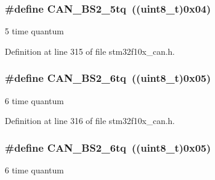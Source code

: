 \subsubsection[{\texorpdfstring{C\+A\+N\+\_\+\+B\+S2\+\_\+5tq}{CAN_BS2_5tq}}]{\setlength{\rightskip}{0pt plus 5cm}\#define C\+A\+N\+\_\+\+B\+S2\+\_\+5tq~(({\bf uint8\+\_\+t})0x04)}\hypertarget{group___c_a_n__time__quantum__in__bit__segment__2_ga89feba32bcc2e909f858d535edaad101}{}\label{group___c_a_n__time__quantum__in__bit__segment__2_ga89feba32bcc2e909f858d535edaad101}
5 time quantum 

Definition at line 315 of file stm32f10x\+\_\+can.\+h.

\subsubsection[{\texorpdfstring{C\+A\+N\+\_\+\+B\+S2\+\_\+6tq}{CAN_BS2_6tq}}]{\setlength{\rightskip}{0pt plus 5cm}\#define C\+A\+N\+\_\+\+B\+S2\+\_\+6tq~(({\bf uint8\+\_\+t})0x05)}\hypertarget{group___c_a_n__time__quantum__in__bit__segment__2_ga72c3245b794d3238763d1ec319bf386f}{}\label{group___c_a_n__time__quantum__in__bit__segment__2_ga72c3245b794d3238763d1ec319bf386f}
6 time quantum 

Definition at line 316 of file stm32f10x\+\_\+can.\+h.

\subsubsection[{\texorpdfstring{C\+A\+N\+\_\+\+B\+S2\+\_\+6tq}{CAN_BS2_6tq}}]{\setlength{\rightskip}{0pt plus 5cm}\#define C\+A\+N\+\_\+\+B\+S2\+\_\+6tq~(({\bf uint8\+\_\+t})0x05)}\hypertarget{group___c_a_n__time__quantum__in__bit__segment__2_ga72c3245b794d3238763d1ec319bf386f}{}\label{group___c_a_n__time__quantum__in__bit__segment__2_ga72c3245b794d3238763d1ec319bf386f}
6 time quantum 

